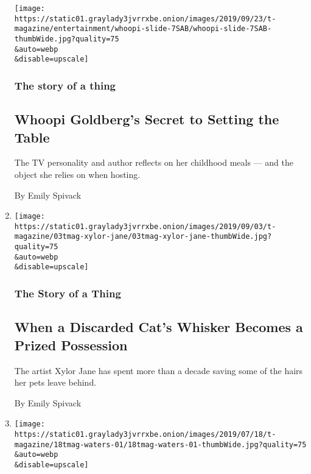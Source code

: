 \begin{enumerate}
  \texttt{[image: https://static01.graylady3jvrrxbe.onion/images/2019/09/23/t-magazine/entertainment/whoopi-slide-7SAB/whoopi-slide-7SAB-thumbWide.jpg?quality=75\\\&auto=webp\\\&disable=upscale]}

  \hypertarget{the-story-of-a-thing-2}{%
  \subsubsection{The story of a thing}\label{the-story-of-a-thing-2}}

  \hypertarget{whoopi-goldbergs-secret-to-setting-the-table}{%
  \subsection{Whoopi Goldberg's Secret to Setting the
  Table}\label{whoopi-goldbergs-secret-to-setting-the-table}}

  The TV personality and author reflects on her childhood meals --- and
  the object she relies on when hosting.

  By Emily Spivack
\item
  \href{/2019/09/04/t-magazine/xylor-jane.html}{}

  \texttt{[image: https://static01.graylady3jvrrxbe.onion/images/2019/09/03/t-magazine/03tmag-xylor-jane/03tmag-xylor-jane-thumbWide.jpg?quality=75\\\&auto=webp\\\&disable=upscale]}

  \hypertarget{the-story-of-a-thing-3}{%
  \subsubsection{The Story of a Thing}\label{the-story-of-a-thing-3}}

  \hypertarget{when-a-discarded-cats-whisker-becomes-a-prized-possession}{%
  \subsection{When a Discarded Cat's Whisker Becomes a Prized
  Possession}\label{when-a-discarded-cats-whisker-becomes-a-prized-possession}}

  The artist Xylor Jane has spent more than a decade saving some of the
  hairs her pets leave behind.

  By Emily Spivack
\item
  \href{/2019/07/18/t-magazine/food/ceramics-alice-waters-collects.html}{}

  \texttt{[image: https://static01.graylady3jvrrxbe.onion/images/2019/07/18/t-magazine/18tmag-waters-01/18tmag-waters-01-thumbWide.jpg?quality=75\\\&auto=webp\\\&disable=upscale]}


\end{enumerate}
